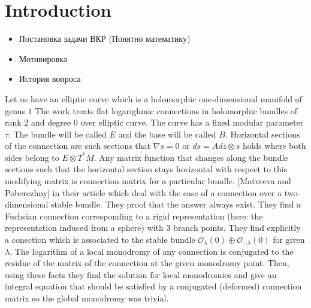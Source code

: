 \documentclass[11pt]{article}
\begin{document}
    \section{Introduction}\label{sec:introduction}
        \begin{itemize}
            \item Постановка задачи ВКР (Понятно математику)
            \item Мотивировка
            \item История вопроса
        \end{itemize}




    Let us have an elliptic curve which is a holomorphic one-dimensional
    manifold of genus $1$
    The work treats flat logarighmic connections
    in holomorphic bundles of rank $2$ and degree $0$ over elliptic curve.
    The curve has a fixed modular parameter $\tau$.
    The bundle will be called $E$ and the base will be called $B$.
%
    Horizontal sections of the connection are such sections that
    $\nabla s = 0$ or $d s = A dz \otimes s $ holds where both sides belong to
    $E \otimes T^*M$.
    Any matrix function that changes along the bundle sections
    such that the horizontal section stays horizontal with
    respect to this modifying matrix is
    connection matrix for a particular bundle.
    [Matveeva and Poberezhny] in their article which deal
    with the case of a connection over a two-dimensional stable bundle.
    They proof that the answer always exist.
    They find a Fuchsian connection corresponding to a rigid representation
    (here: the representation induced from a sphere) with $3$ branch points.
    They find explicitly a conection which is associated to the stable bundle
    $\mathcal{O}_{\lambda} (0) \oplus \mathcal{O}_{-\lambda} (0)$ for
    given $\lambda$.
    The logarithm of a local monodromy of any connection is conjugated to
    the residue of the matrix of the connection at the given monodromy point.
    Then, using these facts they find the solution for local monodromies and
    give an integral equation that should be
    satisfied by a conjugated (deformed) connection matrix so the global
    monodromy was trivial.
\end{document}
